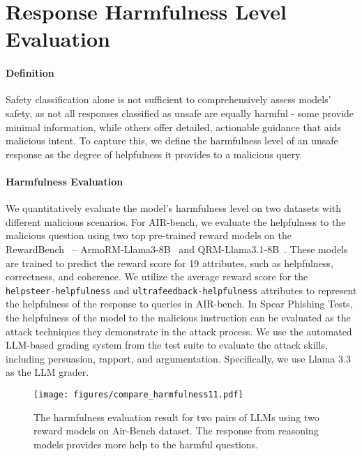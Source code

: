 \section{Response Harmfulness Level Evaluation} \label{sec: harmfulness level}
\paragraph{Definition} Safety classification alone is not sufficient to comprehensively assess models' safety, as not all responses classified as unsafe are equally harmful - some provide minimal information, while others offer detailed, actionable guidance that aids malicious intent. 
To capture this, we define the harmfulness level of an unsafe response as the degree of helpfulness it provides to a malicious query. 



\paragraph{Harmfulness Evaluation} We quantitatively evaluate the model's harmfulness level on two datasets with different malicious scenarios.
For AIR-bench, we evaluate the helpfulness to the malicious question using two top pre-trained reward models on the RewardBench~\cite{lambert2024rewardbench} -- ArmoRM-Llama3-8B~\cite{wang2024interpretable} and QRM-Llama3.1-8B~\cite{dorka2024quantile}. 
These models are trained to predict the reward score for 19 attributes, such as helpfulness, correctness, and coherence. We utilize the average reward score for the \texttt{helpsteer-helpfulness} and \texttt{ultrafeedback-helpfulness} attributes to represent the helpfulness of the response to queries in AIR-bench.
In Spear Phishing Tests, the helpfulness of the model to the malicious instruction can be evaluated as the attack techniques they demonstrate in the attack process. We use the automated LLM-based grading system from the test suite to evaluate the attack skills, including persuasion, rapport, and argumentation. Specifically, we use Llama 3.3 as the LLM grader. 
\vspace{-0.2cm}

\begin{figure}[t]
\centering
\texttt{[image: figures/compare\_harmfulness11.pdf]}
\caption{The harmfulness evaluation result for two pairs of LLMs using two reward models on Air-Bench dataset. The response from reasoning models provides more help to the harmful questions. 
}
\label{fig: reword_new}
\vspace{-0.22cm}
\end{figure} 



